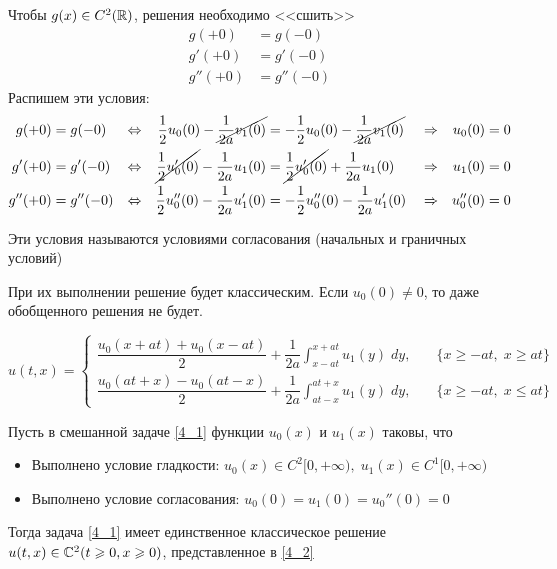 \documentclass[../main.tex]{subfiles}
\begin{document}
Чтобы $g(x) \in C^2(\mathbb{R})$, решения необходимо <<сшить>>
\begin{align*}
    g(+0) &= g(-0) \\
    g'(+0) &= g'(-0) \\
    g''(+0) &= g''(-0)
\end{align*}
Распишем эти условия:
\begin{align*}
     g(+0) &= g(-0) &\Leftrightarrow&& 
    \frac{1}{2}u_0(0) - \cancel{\frac{1}{2a}v_1(0)} &= -\frac{1}{2}u_0(0) - \cancel{\frac{1}{2a}v_1(0)} &&\Rightarrow& u_0(0) &= 0 \\
     g'(+0) &= g'(-0) &\Leftrightarrow&& \cancel{\frac{1}{2}u'_0(0)} - \frac{1}{2a}u_1(0) &=
    \cancel{\frac{1}{2}u'_0(0)} + \frac{1}{2a}u_1(0) &&\Rightarrow& u_1(0) &= 0 \\
     g''(+0) &= g''(-0) &\Leftrightarrow&& \frac{1}{2} u''_0(0) - \frac{1}{2a} u_1'(0) &= -\frac{1}{2}u_0''(0) - \frac{1}{2a} u_1'(0) &&\Rightarrow& u_0''(0) &= 0
\end{align*}

\begin{definition}
    Эти условия называются условиями согласования (начальных и граничных условий)
\end{definition}

При их выполнении решение будет классическим. Если $u_0(0) \ne 0$, то даже обобщенного решения не будет.


\begin{equation} \label{4_2}
        u(t, x) = \begin{cases}
            \dfrac{u_0(x+at) + u_0(x-at)}{2} + \dfrac{1}{2a}\displaystyle\int_{x-at}^{x+at}u_1(y)\;dy,\quad & \{x\geq -at,\; x\geq at\} \\[1em]

            \dfrac{u_0(at+x) - u_0(at-x)}{2} + \dfrac{1}{2a}\displaystyle\int_{at-x}^{at+x}u_1(y)\;dy,\quad & \{x\geq -at,\; x\leq at\}
        \end{cases}
\end{equation}
\vspace{0pt}

\begin{theorem}
    Пусть в смешанной задаче \ref{4_1} функции $u_0(x)$ и $u_1(x)$ таковы, что 
    \begin{itemize}
        \item Выполнено условие гладкости: $u_0(x)\in C^2[0, +\infty), \; u_1(x) \in C^1[0, +\infty)$
        \item Выполнено условие согласования: $u_0(0) = u_1(0) = u_0''(0) = 0$
    \end{itemize}
    Тогда задача \ref{4_1} имеет единственное классическое решение $u(t,x) \in \mathbb{C}^2(t \geqslant 0, x\geqslant 0)$, представленное в \ref{4_2}
\end{theorem}
\end{document}
